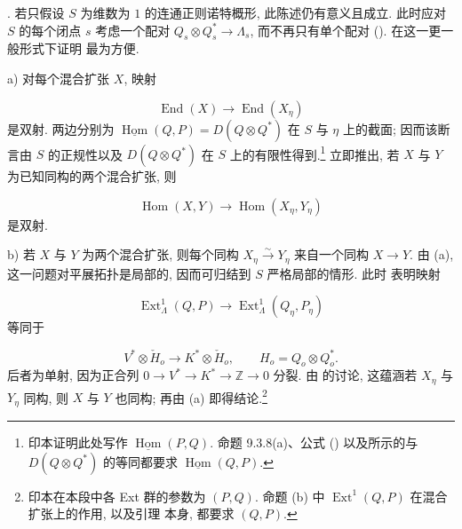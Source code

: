 \medskip
\noindent
{}. 若只假设 $S$ 为维数为 $1$ 的连通正则诺特概形, 此陈述仍有意义且成立. 此时应对 $S$ 的每个闭点 $s$ 考虑一个配对 $Q_s\otimes Q_s^*\longrightarrow\Lambda_s$, 而不再只有单个配对 (). 在这一更一般形式下证明  最为方便.

\smallskip
\noindent
a) 对每个混合扩张 $X$, 映射

\begin{equation*}
\operatorname{End}(X)\longrightarrow\operatorname{End}(X_\eta)
\end{equation*}
是双射. 两边分别为 $\underline{\operatorname{Hom}}(Q,P)=D(Q\otimes Q^*)$ 在 $S$ 与 $\eta$ 上的截面; 因而该断言由 $S$ 的正规性以及 $D(Q\otimes Q^*)$ 在 $S$ 上的有限性得到.\footnote{印本证明此处写作 $\underline{\operatorname{Hom}}(P,Q)$. 命题 9.3.8(a)、公式 () 以及所示的与 $D(Q\otimes Q^*)$ 的等同都要求 $\underline{\operatorname{Hom}}(Q,P)$.} 立即推出, 若 $X$ 与 $Y$ 为已知同构的两个混合扩张, 则

\begin{equation*}
\operatorname{Hom}(X,Y)\longrightarrow
\operatorname{Hom}(X_\eta,Y_\eta)
\end{equation*}
是双射.

\smallskip
\noindent
b) 若 $X$ 与 $Y$ 为两个混合扩张, 则每个同构 $X_\eta\xrightarrow{\sim}Y_\eta$ 来自一个同构 $X\longrightarrow Y$. 由 (a), 这一问题对平展拓扑是局部的, 因而可归结到 $S$ 严格局部的情形. 此时  表明映射

\begin{equation*}
\operatorname{Ext}^1_\Lambda(Q,P)
\longrightarrow\operatorname{Ext}^1_\Lambda(Q_\eta,P_\eta)
\end{equation*}
等同于

\begin{equation*}
V^*\otimes\check H_o\longrightarrow K^*\otimes\check H_o,
\qquad H_o=Q_o\otimes Q_o^*.
\end{equation*}
后者为单射, 因为正合列 $0\longrightarrow V^*\longrightarrow K^*\longrightarrow\mathbb Z
\longrightarrow0$ 分裂. 由  的讨论, 这蕴涵若 $X_\eta$ 与 $Y_\eta$ 同构, 则 $X$ 与 $Y$ 也同构; 再由 (a) 即得结论.\footnote{印本在本段中各 Ext 群的参数为 $(P,Q)$. 命题 (b) 中 $\operatorname{Ext}^1(Q,P)$ 在混合扩张上的作用, 以及引理  本身, 都要求 $(Q,P)$.}

